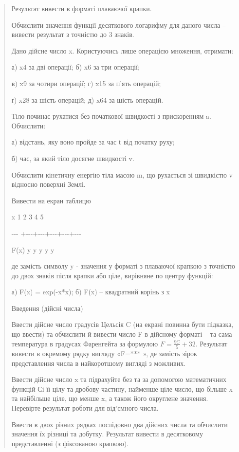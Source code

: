 \documentclass[]{article}
\begin{document}
\begin{quote}
Результат вивести в форматі плаваючої крапки.

Обчислити значення функції десяткового логарифму для даного числа --
вивести результат з точністю до 3 знаків.

Дано дійсне число x. Користуючись лише операцією множення, отримати:

а) x4 за дві операції; б) x6 за три операції;

в) x9 за чотири операції; г) x15 за п'ять операцій;

ґ) x28 за шість операцій; д) x64 за шість операцій.

Тіло починає рухатися без початкової швидкості з прискоренням a.
Обчислити:

а) відстань, яку воно пройде за час t від початку руху;

б) час, за який тіло досягне швидкості v.

Обчислити кінетичну енергію тіла масою m, що рухається зі швидкістю v
відносно поверхні Землі.

Вивести на екран таблицю

x \textbar{} 1 \textbar{} 2 \textbar{} 3 \textbar{} 4 \textbar{} 5

-\/-\/- +-\/-\/-+-\/-\/-+-\/-\/-+-\/-\/-+-\/-\/-

F(x)\textbar{} y \textbar{} y \textbar{} y \textbar{} y \textbar{} y

де замість символу y - значення у форматі з плаваючої крапкою з точністю
до двох знаків після крапки або ціле, вирівняне по центру функцій:

а) F(x) = exp(-x*x); б) F(x) -- квадратний корінь з x

Введення (дійсні числа)

Ввести дійсне число градусів Цельсія C (на екрані повинна бути підказка,
що ввести) та обчислити й вивести число F в дійсному форматі -- та сама
температура в градусах Фаренгейта за формулою \(F = \frac{9C}{5} + 32\).
Результат вивести в окремому рядку вигляду «F=*** », де замість зірок
представлення числа в найкоротшому вигляді з можливих.

Ввести дійсне число x та підрахуйте без та за допомогою математичних
функцій Сі її цілу та дробову частину, найменше ціле число, що більше x
та найбільше ціле, що менше x, а також його округлене значення.
Перевірте результат роботи для від'ємного числа.

Ввести в двох різних рядках послідовно два дійсних числа та обчислити
значення їх різниці та добутку. Результат вивести в десятковому
представленні (з фіксованою крапкою).


\end{quote}
\end{document}
